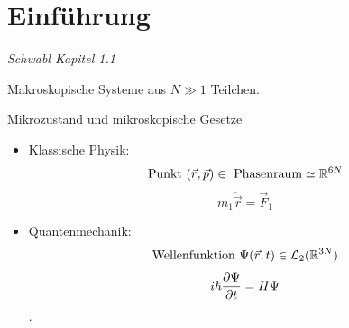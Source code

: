 \section{Einf\"uhrung}
\emph{Schwabl Kapitel 1.1} \\
\begin{description}
  \item Makroskopische Systeme aus $N \gg 1$ Teilchen.
  \item Mikrozustand und mikroskopische Gesetze
    \begin{itemize}
      \item Klassische Physik: 
        \[\text{Punkt } (\vec{r}, \vec{p}) \in \text{ Phasenraum} \simeq \mathbb{R}^{6N} \]
        \[ m_1 \ddot{\vec{r}} = \vec{F}_1 \]
      \item Quantenmechanik: 
        \[ \text{Wellenfunktion } \Psi (\vec{r},t) \in \mathcal {L}_2 (\mathbb{R}^{3N}) \]
        \[ i \hbar \frac{\partial \Psi }{\partial t}= H \Psi \]. 
    \end{itemize}
    

\end{description}
